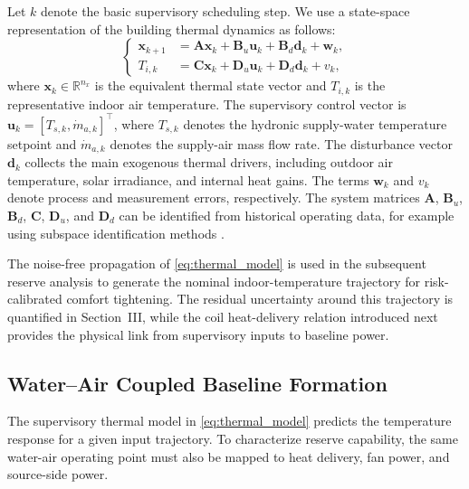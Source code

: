 \documentclass[journal]{IEEEtran}
\theoremstyle{remark}
\begin{document}
	Let \(k\) denote the basic supervisory scheduling step. We use a state-space representation of the building thermal dynamics as follows\cite{rousseau2025uncertainty}:
	\begin{equation}
		\left\{
		\begin{aligned}
			\mathbf{x}_{k+1} &= \mathbf{A}\mathbf{x}_{k}
			+ \mathbf{B}_{u}\mathbf{u}_{k}
			+ \mathbf{B}_{d}\mathbf{d}_{k}
			+ \mathbf{w}_{k}, \\
			T_{i,k} &= \mathbf{C}\mathbf{x}_{k}
			+ \mathbf{D}_{u}\mathbf{u}_{k}
			+ \mathbf{D}_{d}\mathbf{d}_{k}
			+ v_{k},
		\end{aligned}
		\right.
		\label{eq:thermal_model}
	\end{equation}
	where \(\mathbf{x}_{k}\in\mathbb{R}^{n_x}\) is the equivalent thermal state vector and \(T_{i,k}\) is the representative indoor air temperature. The supervisory control vector is
	\(\mathbf{u}_{k}=[T_{s,k},\dot m_{a,k}]^{\top}\), where \(T_{s,k}\) denotes the hydronic supply-water temperature setpoint and \(\dot m_{a,k}\) denotes the supply-air mass flow rate. The disturbance vector \(\mathbf{d}_{k}\) collects the main exogenous thermal drivers, including outdoor air temperature, solar irradiance, and internal heat gains. The terms \(\mathbf{w}_k\) and \(v_k\) denote process and measurement errors, respectively. The system matrices \(\mathbf{A}\), \(\mathbf{B}_{u}\), \(\mathbf{B}_{d}\), \(\mathbf{C}\), \(\mathbf{D}_{u}\), and \(\mathbf{D}_{d}\) can be identified from historical operating data, for example using subspace identification methods \cite{overschee1996subspace}.
	
	The noise-free propagation of \eqref{eq:thermal_model} is used in the subsequent reserve analysis to generate the nominal indoor-temperature trajectory for risk-calibrated comfort tightening. The residual uncertainty around this trajectory is quantified in Section~III, while the coil heat-delivery relation introduced next provides the physical link from supervisory inputs to baseline power.
	
	\subsection{Water--Air Coupled Baseline Formation}
	
	The supervisory thermal model in \eqref{eq:thermal_model} predicts the temperature response for a given input trajectory. To characterize reserve capability, the same water-air operating point must also be mapped to heat delivery, fan power, and source-side power.
	
\end{document}
